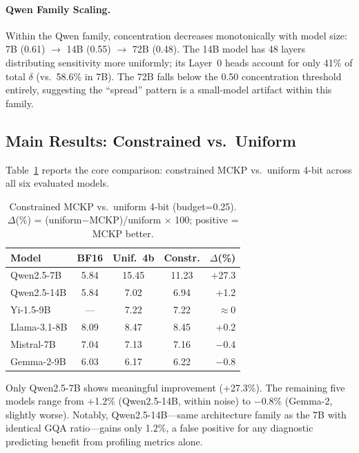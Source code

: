 \documentclass[11pt,a4paper]{article}
\begin{document}
\paragraph{Qwen Family Scaling.}
Within the Qwen family, concentration decreases monotonically with model size: 7B (0.61) $\to$ 14B (0.55) $\to$ 72B (0.48). The 14B model has 48 layers distributing sensitivity more uniformly; its Layer~0 heads account for only 41\% of total $\delta$ (vs.\ 58.6\% in 7B). The 72B falls below the 0.50 concentration threshold entirely, suggesting the ``spread'' pattern is a small-model artifact within this family.

\subsection{Main Results: Constrained vs.\ Uniform}
\label{sec:main_results}

Table~\ref{tab:main} reports the core comparison: constrained MCKP vs.\ uniform 4-bit across all six evaluated models.

\begin{table}[t]
\centering
\small
\begin{tabular}{lcccr}
\toprule
\textbf{Model} & \textbf{BF16} & \textbf{Unif.\ 4b} & \textbf{Constr.} & \textbf{$\Delta$(\%)} \\
\midrule
Qwen2.5-7B   & 5.84 & 15.45 & 11.23 & +27.3 \\
Qwen2.5-14B  & 5.84 &  7.02 &  6.94 & +1.2 \\
Yi-1.5-9B    & ---  &  7.22 &  7.22 & $\approx$0 \\
Llama-3.1-8B & 8.09 &  8.47 &  8.45 & +0.2 \\
Mistral-7B   & 7.04 &  7.13 &  7.16 & $-$0.4 \\
Gemma-2-9B   & 6.03 &  6.17 &  6.22 & $-$0.8 \\
\bottomrule
\end{tabular}
\caption{Constrained MCKP vs.\ uniform 4-bit (budget=0.25). $\Delta$(\%) = (uniform$-$MCKP)/uniform $\times$ 100; positive = MCKP better.}
\label{tab:main}
\end{table}

Only Qwen2.5-7B shows meaningful improvement (+27.3\%). The remaining five models range from +1.2\% (Qwen2.5-14B, within noise) to $-$0.8\% (Gemma-2, slightly worse). Notably, Qwen2.5-14B---same architecture family as the 7B with identical GQA ratio---gains only 1.2\%, a false positive for any diagnostic predicting benefit from profiling metrics alone.
\end{document}
